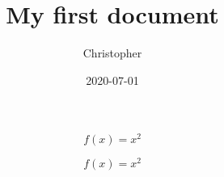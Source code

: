 \documentclass{article}
\title{My first document}
\date{2020-07-01}
\author{Christopher}
\begin{document}
	\maketitle
	\newpage
	
	\begin{equation}
		f(x) = x^2
	\end{equation}
	
	\begin{equation*}
		f(x) = x^2
	\end{equation*}
\end{document}
